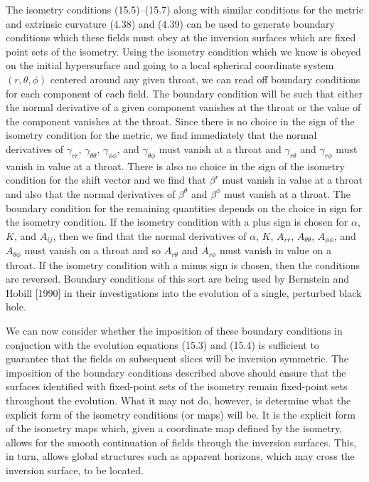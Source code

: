 The isometry conditions (15.5)--(15.7) along with similar conditions for the
metric and extrinsic curvature (4.38) and (4.39) can be used to generate
boundary conditions which these fields must obey at the inversion surfaces which
are fixed point sets of the isometry.  Using the isometry condition which we
know is obeyed on the initial hypersurface and going to a local spherical
coordinate system $(r,\theta,\phi)$ centered around any given throat, we can
read off boundary conditions for each component of each field.  The boundary
condition will be such that either the normal derivative of a given component
vanishes at the throat or the value of the component vanishes at the throat. 
Since there is no choice in the sign of the isometry condition for the metric,
we find immediately that the normal derivatives of $\gamma_{rr}$,
$\gamma_{\theta\theta}$, $\gamma_{\phi\phi}$, and $\gamma_{\theta\phi}$ must
vanish at a throat and $\gamma_{r\theta}$ and $\gamma_{r\phi}$ must vanish in
value at a throat.  There is also no choice in the sign of the isometry
condition for the shift vector and we find that $\beta^r$ must vanish in value
at a throat and also that the normal derivatives of $\beta^\theta$ and
$\beta^\phi$ must vanish at a throat.  The boundary condition for the remaining
quantities depends on the choice in sign for the isometry condition.  If the
isometry condition with a plus sign is chosen for $\alpha$, $K$, and $A_{ij}$,
then we find that the normal derivatives of $\alpha$, $K$, $A_{rr}$,
$A_{\theta\theta}$, $A_{\phi\phi}$, and $A_{\theta\phi}$ must vanish on a throat
and so $A_{r\theta}$ and $A_{r\phi}$ must vanish in value on a throat.  If the
isometry condition with a minus sign is chosen, then the conditions are
reversed.  Boundary conditions of this sort are being used by Bernstein and
Hobill [1990] in their investigations into the evolution of a single, perturbed
black hole.

We can now consider whether the imposition of these boundary conditions in
conjuction with the evolution equations (15.3) and (15.4) is sufficient to
guarantee that the fields on subsequent slices will be inversion symmetric.  The
imposition of the boundary conditions described above should ensure that the
surfaces identified with  fixed-point sets of the isometry remain fixed-point
sets throughout the evolution.  What it may not do, however, is determine what
the explicit form of the isometry conditions (or maps) will be.  It is the
explicit form of the isometry maps which, given a coordinate map defined by the
isometry, allows for the smooth continuation of fields through the inversion
surfaces.  This, in turn, allows global structures such as apparent horizons,
which may cross the inversion surface, to be located.

